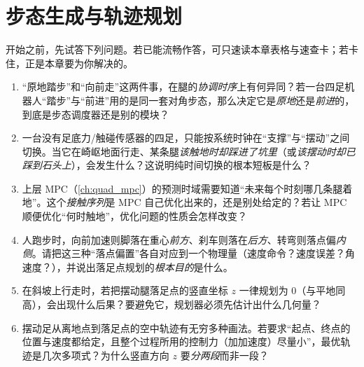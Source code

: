 \chapter{步态生成与轨迹规划}
\label{ch:quad_gait}



\begin{practice}[前置自测]
开始之前，先试答下列问题。若已能流畅作答，可只速读本章表格与速查卡；若卡住，正是本章要为你解决的。
\begin{enumerate}
  \item “原地踏步”和“向前走”这两件事，在腿的\emph{协调时序}上有何异同？若一台四足机器人“踏步”与“前进”用的是同一套对角步态，那么决定它是\emph{原地}还是\emph{前进}的，到底是步态调度器还是别的模块？
  \item 一台没有足底力/触碰传感器的四足，只能按系统时钟在“支撑”与“摆动”之间切换。当它在崎岖地面行走、某条腿\emph{该触地时却踩进了坑里}（或\emph{该摆动时却已踩到石头上}），会发生什么？这说明纯时间切换的根本短板是什么？
  \item 上层 MPC（\cref{ch:quad_mpc}）的预测时域需要知道“未来每个时刻哪几条腿着地”。这个\emph{接触序列}是 MPC 自己优化出来的，还是别处给定的？若让 MPC 顺便优化“何时触地”，优化问题的性质会怎样改变？
  \item 人跑步时，向前加速则脚落在重心\emph{前方}、刹车则落在\emph{后方}、转弯则落点偏\emph{内侧}。请把这三种“落点偏置”各自对应到一个物理量（速度命令？速度误差？角速度？），并说出落足点规划的\emph{根本目的}是什么。
  \item 在斜坡上行走时，若把摆动腿落足点的竖直坐标 $z$ 一律规划为 $0$（与平地同高），会出现什么后果？要避免它，规划器必须先估计出什么几何量？
  \item 摆动足从离地点到落足点的空中轨迹有无穷多种画法。若要求“起点、终点的位置与速度都给定，且整个过程所用的控制力（加加速度）尽量小”，最优轨迹是几次多项式？为什么竖直方向 $z$ 要\emph{分两段}而非一段？
\end{enumerate}
\end{practice}

